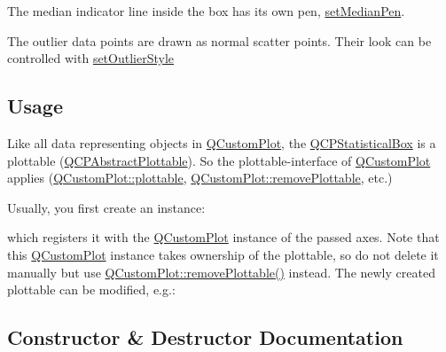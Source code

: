 The median indicator line inside the box has its own pen, \mbox{\hyperlink{class_q_c_p_statistical_box_a7260ac55b669f5d0a74f16d5ca84c52c}{set\+Median\+Pen}}.

The outlier data points are drawn as normal scatter points. Their look can be controlled with \mbox{\hyperlink{class_q_c_p_statistical_box_ad5241943422eb8e58360a97e99ad6aa7}{set\+Outlier\+Style}}\hypertarget{class_q_c_p_statistical_box_qcpstatisticalbox-usage}{}\subsection{Usage}\label{class_q_c_p_statistical_box_qcpstatisticalbox-usage}
Like all data representing objects in \mbox{\hyperlink{class_q_custom_plot}{Q\+Custom\+Plot}}, the \mbox{\hyperlink{class_q_c_p_statistical_box}{Q\+C\+P\+Statistical\+Box}} is a plottable (\mbox{\hyperlink{class_q_c_p_abstract_plottable}{Q\+C\+P\+Abstract\+Plottable}}). So the plottable-\/interface of \mbox{\hyperlink{class_q_custom_plot}{Q\+Custom\+Plot}} applies (\mbox{\hyperlink{class_q_custom_plot_a32de81ff53e263e785b83b52ecd99d6f}{Q\+Custom\+Plot\+::plottable}}, \mbox{\hyperlink{class_q_custom_plot_af3dafd56884208474f311d6226513ab2}{Q\+Custom\+Plot\+::remove\+Plottable}}, etc.)

Usually, you first create an instance\+: 
\begin{DoxyCodeInclude}{0}
\end{DoxyCodeInclude}
which registers it with the \mbox{\hyperlink{class_q_custom_plot}{Q\+Custom\+Plot}} instance of the passed axes. Note that this \mbox{\hyperlink{class_q_custom_plot}{Q\+Custom\+Plot}} instance takes ownership of the plottable, so do not delete it manually but use \mbox{\hyperlink{class_q_custom_plot_af3dafd56884208474f311d6226513ab2}{Q\+Custom\+Plot\+::remove\+Plottable()}} instead. The newly created plottable can be modified, e.\+g.\+: 
\begin{DoxyCodeInclude}{0}
\end{DoxyCodeInclude}


\subsection{Constructor \& Destructor Documentation}
\mbox{\label{class_q_c_p_statistical_box_a75c2b3e7fcd0741cc981693a2ba63b27}} 
